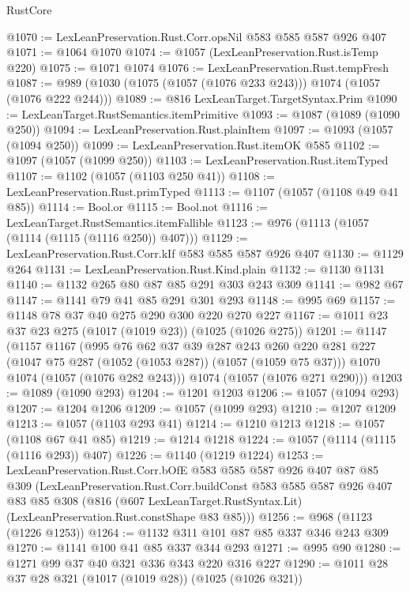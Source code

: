 \begin{lexlean}{RustCore}
\begin{coremodule}
@1070 := LexLeanPreservation.Rust.Corr.opsNil @583 @585 @587 @926 @407
@1071 := @1064 @1070
@1074 := @1057 (LexLeanPreservation.Rust.isTemp @220)
@1075 := @1071 @1074
@1076 := LexLeanPreservation.Rust.tempFresh
@1087 := @989 (@1030 (@1075 (@1057 (@1076 @233 @243))) @1074 (@1057 (@1076 @222 @244)))
@1089 := @816 LexLeanTarget.TargetSyntax.Prim
@1090 := LexLeanTarget.RustSemantics.itemPrimitive
@1093 := @1087 (@1089 (@1090 @250))
@1094 := LexLeanPreservation.Rust.plainItem
@1097 := @1093 (@1057 (@1094 @250))
@1099 := LexLeanPreservation.Rust.itemOK @585
@1102 := @1097 (@1057 (@1099 @250))
@1103 := LexLeanPreservation.Rust.itemTyped
@1107 := @1102 (@1057 (@1103 @250 @41))
@1108 := LexLeanPreservation.Rust.primTyped
@1113 := @1107 (@1057 (@1108 @49 @41 @85))
@1114 := Bool.or
@1115 := Bool.not
@1116 := LexLeanTarget.RustSemantics.itemFallible
@1123 := @976 (@1113 (@1057 (@1114 (@1115 (@1116 @250)) @407)))
@1129 := LexLeanPreservation.Rust.Corr.kIf @583 @585 @587 @926 @407
@1130 := @1129 @264
@1131 := LexLeanPreservation.Rust.Kind.plain
@1132 := @1130 @1131
@1140 := @1132 @265 @80 @87 @85 @291 @303 @243 @309
@1141 := @982 @67
@1147 := @1141 @79 @41 @85 @291 @301 @293
@1148 := @995 @69
@1157 := @1148 @78 @37 @40 @275 @290 @300 @220 @270 @227
@1167 := @1011 @23 @37 @23 @275 (@1017 (@1019 @23)) (@1025 (@1026 @275))
@1201 := @1147
    (@1157
      @1167
      (@995
        @76
        @62
        @37
        @39
        @287
        @243
        @260
        @220
        @281
        @227
        (@1047 @75 @287 (@1052 (@1053 @287)) (@1057 (@1059 @75 @37)))
        @1070
        @1074
        (@1057 (@1076 @282 @243)))
      @1074
      (@1057 (@1076 @271 @290)))
@1203 := @1089 (@1090 @293)
@1204 := @1201 @1203
@1206 := @1057 (@1094 @293)
@1207 := @1204 @1206
@1209 := @1057 (@1099 @293)
@1210 := @1207 @1209
@1213 := @1057 (@1103 @293 @41)
@1214 := @1210 @1213
@1218 := @1057 (@1108 @67 @41 @85)
@1219 := @1214 @1218
@1224 := @1057 (@1114 (@1115 (@1116 @293)) @407)
@1226 := @1140 (@1219 @1224)
@1253 := LexLeanPreservation.Rust.Corr.bOfE
    @583
    @585
    @587
    @926
    @407
    @87
    @85
    @309
    (LexLeanPreservation.Rust.Corr.buildConst
      @583
      @585
      @587
      @926
      @407
      @83
      @85
      @308
      (@816 (@607 LexLeanTarget.RustSyntax.Lit) (LexLeanPreservation.Rust.constShape @83 @85)))
@1256 := @968 (@1123 (@1226 @1253))
@1264 := @1132 @311 @101 @87 @85 @337 @346 @243 @309
@1270 := @1141 @100 @41 @85 @337 @344 @293
@1271 := @995 @90
@1280 := @1271 @99 @37 @40 @321 @336 @343 @220 @316 @227
@1290 := @1011 @28 @37 @28 @321 (@1017 (@1019 @28)) (@1025 (@1026 @321))

\end{coremodule}
\end{lexlean}
